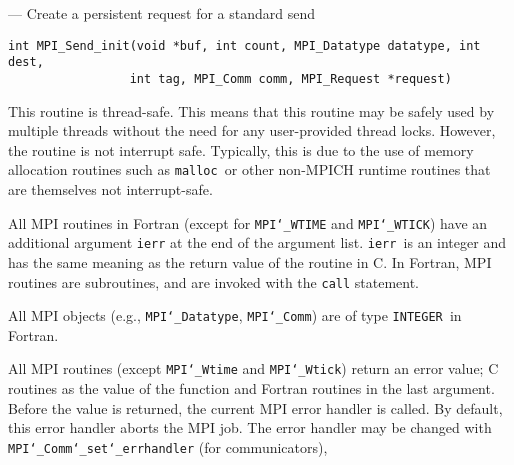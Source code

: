 \startmanpage
{}
--- Create a persistent request for a standard send 
\startvb\begin{verbatim}
int MPI_Send_init(void *buf, int count, MPI_Datatype datatype, int dest,
                 int tag, MPI_Comm comm, MPI_Request *request)

\end{verbatim}
\endvb

\par
{}
\par
{}
\par
This routine is thread-safe.  This means that this routine may be
safely used by multiple threads without the need for any user-provided
thread locks.  However, the routine is not interrupt safe.  Typically,
this is due to the use of memory allocation routines such as {\tt malloc
}or other non-MPICH runtime routines that are themselves not interrupt-safe.
\par
{}
All MPI routines in Fortran (except for {\tt MPI{\tt \char`\_}WTIME} and {\tt MPI{\tt \char`\_}WTICK}) have
an additional argument {\tt ierr} at the end of the argument list.  {\tt ierr
}is an integer and has the same meaning as the return value of the routine
in C.  In Fortran, MPI routines are subroutines, and are invoked with the
{\tt call} statement.
\par
All MPI objects (e.g., {\tt MPI{\tt \char`\_}Datatype}, {\tt MPI{\tt \char`\_}Comm}) are of type {\tt INTEGER
}in Fortran.
\par
{}
\par
All MPI routines (except {\tt MPI{\tt \char`\_}Wtime} and {\tt MPI{\tt \char`\_}Wtick}) return an error value;
C routines as the value of the function and Fortran routines in the last
argument.  Before the value is returned, the current MPI error handler is
called.  By default, this error handler aborts the MPI job.  The error handler
may be changed with {\tt MPI{\tt \char`\_}Comm{\tt \char`\_}set{\tt \char`\_}errhandler} (for communicators),
